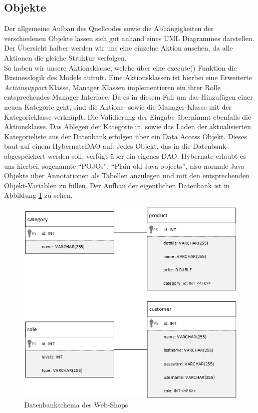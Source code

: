 \documentclass[12pt,a4paper]{article}
\begin{document}
	\subsection{Objekte}
	Der allgemeine Aufbau des Quellcodes sowie die Abhängigkeiten der verschiedenen Objekte lassen sich gut anhand eines UML Diagrammes darstellen. Der Übersicht halber werden wir uns eine einzelne Aktion ansehen, da alle Aktionen die gleiche Struktur verfolgen.\\
	So haben wir unsere Aktionsklasse, welche über eine execute() Funktion die Businesslogik des Models aufruft. Eine Aktionsklassen ist hierbei eine Erweiterte \textit{Actionsupport} Klasse, Manager Klassen implementieren ein ihrer Rolle entsprechendes Manager Interface. Da es in diesem Fall um das Hinzufügen einer neuen Kategorie geht, sind die Aktions- sowie die Manager-Klasse mit der Kategorieklasse verknüpft. Die Validierung der Eingabe übernimmt ebenfalls die Aktionsklasse.
	Das Ablegen der Kategorie in, sowie das Laden der aktualisierten Kategorieliste aus der Datenbank erfolgen über ein Data Access Objekt. Dieses baut auf einem HybernateDAO auf. Jedes Objekt, das in die Datenbank abgespeichert werden soll, verfügt über ein eigenes DAO. Hybernate erlaubt es uns hierbei, sogenannte "`POJOs"', "`Plain old Java objects"', also normale Java Objekte über Annotationen als Tabellen anzulegen und mit den entsprechenden Objekt-Variablen zu füllen. Der Aufbau der eigentlichen Datenbank ist in Abbildung \ref{fig:DB_schema} zu sehen.
	\begin{figure}[H]
		\centering
		\includegraphics[scale=0.5]{diagrams/db_schema.jpg}
		\caption{Datenbankschema des Web-Shops}
		\label{fig:DB_schema}
	\end{figure}
\end{document}
